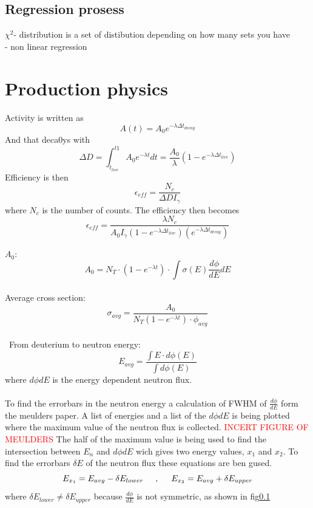 \documentclass[twoside,english]{uiofysmaster/uiofysmaster}
\begin{document}
\subsection{Regression prosess}

$\chi^2$- distribution is a set of distibution depending on how many sets you have 
\\
- non linear regression

\section{Production physics}
\label{sec: prod_physics}

Activity is written as $$A(t) = A_0 e^{-\lambda \Delta t_{decay}}$$
And that deca0ys with $$\Delta D = \int_{t_{live}}^{t1} A_0 e^{-\lambda t} dt = \frac{A_0}{\lambda} (1- e^{-\lambda \Delta t_{live}})$$
Efficiency is then $$\epsilon_{eff} = \frac{N_c}{\Delta D I_{\gamma}}$$ where $N_c$ is the number of counts.
The efficiency then becomes $$\epsilon_{eff} = \frac{\lambda N_c}{A_0 I_{\gamma} (1 - e^{-\lambda \Delta t_{live}}) (e^{-\lambda \Delta t_{decay}})}$$


$A_0$: $$A_0 = N_T \cdot (1-e^{-\lambda t}) \cdot \int \sigma(E) \frac{d\phi}{dE} dE$$
\\
Average cross section: $$\sigma_{avg} = \frac{A_0}{N_T (1-e^{-\lambda t}) \cdot \phi_{avg}} $$
\\
\
From deuterium to neutron energy:
\\
$$E_{avg} = \frac{\int E \cdot d\phi(E)}{\int d\phi ( E)} $$ 
where $d\phi dE$  is the energy dependent neutron flux.
\\
\\
To find the errorbars in the neutron energy a calculation of FWHM of $\frac{d\phi}{dE}$ form the meulders paper\cite{Meulders}. A list of energies and a list of the $d\phi dE$ is being plotted where the maximum value of the neutron flux is collected. \textcolor{red}{INCERT FIGURE OF MEULDERS} The half of the maximum value is being used to find the intersection between $E_n$ and $d\phi dE$ wich gives two energy values, $x_1$ and $x_2$. To find the errorbars $\delta E$ of the neutron flux these equations are ben gused.
$$E_{x_1} = E_{avg} - \delta E_{lower}\hspace{.5cm} , \hspace{.5cm} E_{x_2} = E_{avg} + \delta E_{upper}$$ where $\delta E_{lower} \neq \delta E_{upper}$ because $\frac{d\phi}{dE}$ is not symmetric, as shown in fig\ref{}
\end{document}
